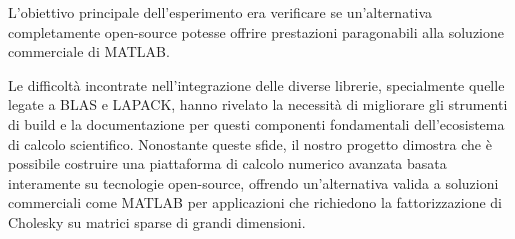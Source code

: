 L'obiettivo principale dell'esperimento era verificare se un'alternativa completamente open-source potesse offrire prestazioni 
paragonabili alla soluzione commerciale di MATLAB.

Le difficoltà incontrate nell'integrazione delle diverse librerie, specialmente quelle legate a BLAS e LAPACK, hanno rivelato 
la necessità di migliorare gli strumenti di build e la documentazione per questi componenti fondamentali dell'ecosistema di 
calcolo scientifico. Nonostante queste sfide, il nostro progetto dimostra che è possibile costruire una piattaforma di calcolo 
numerico avanzata basata interamente su tecnologie open-source, offrendo un'alternativa valida a soluzioni commerciali come MATLAB per 
applicazioni che richiedono la fattorizzazione di Cholesky su matrici sparse di grandi dimensioni.
